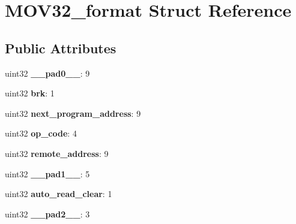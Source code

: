 \hypertarget{structMOV32__format}{}\section{M\+O\+V32\+\_\+format Struct Reference}
\label{structMOV32__format}
\subsection*{Public Attributes}
\begin{DoxyCompactItemize}
\item 
\mbox{\label{structMOV32__format_a64f878d47cffde3846dfefadce907c90}} 
uint32 {\bfseries \+\_\+\+\_\+pad0\+\_\+\+\_\+}\+: 9
\item 
\mbox{\label{structMOV32__format_a97f419b218f8526d28e2d6fd70a26a13}} 
uint32 {\bfseries brk}\+: 1
\item 
\mbox{\label{structMOV32__format_a59ceee9e4422751de1699cf871c9bfa5}} 
uint32 {\bfseries next\+\_\+program\+\_\+address}\+: 9
\item 
\mbox{\label{structMOV32__format_a3ee1b7b78de05ced9332d98193a5cb24}} 
uint32 {\bfseries op\+\_\+code}\+: 4
\item 
\mbox{\label{structMOV32__format_a0bd42fd02ba14bb252bbf9db812e61df}} 
uint32 {\bfseries remote\+\_\+address}\+: 9
\item 
\mbox{\label{structMOV32__format_a43cb13cb76c4442fec8673190abaf764}} 
uint32 {\bfseries \+\_\+\+\_\+pad1\+\_\+\+\_\+}\+: 5
\item 
\mbox{\label{structMOV32__format_a035b5af2318d93317e7578a92672eab8}} 
uint32 {\bfseries auto\+\_\+read\+\_\+clear}\+: 1
\item 
\mbox{\label{structMOV32__format_ac70af675454ef5eb8986114789c27b7d}} 
uint32 {\bfseries \+\_\+\+\_\+pad2\+\_\+\+\_\+}\+: 3
\item 
\mbox{\label{structMOV32__format_a8d851913807542f2ce68daf88f24ec79}} 

\end{DoxyCompactItemize}
